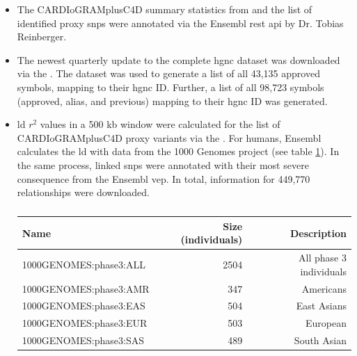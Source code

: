 \begin{itemize}
    \item {} The CARDIoGRAMplusC4D summary statistics from \textcite{aragamDiscoverySystematicCharacterization2021} and the list of identified proxy \acp{snp} were annotated via the Ensembl \ac{rest} \ac{api} by Dr. Tobias Reinberger.

    \item {} The newest quarterly update to the complete \ac{hgnc} dataset was downloaded via the . The dataset was used to generate a list of all 43,135 approved symbols, mapping to their \ac{hgnc} ID. Further, a list of all 98,723 symbols (approved, alias, and previous) mapping to their \ac{hgnc} ID was generated.

    \item {} \ac{ld} $r^2$ values in a 500 kb window were calculated for the list of CARDIoGRAMplusC4D proxy variants via the . For humans, Ensembl calculates the \ac{ld} with data from the 1000 Genomes project (see table \ref{tab:populations}). In the same process, linked \acp{snp} were annotated with their most severe consequence from the Ensembl \ac{vep}. In total, information for 449,770 relationships were downloaded.

    \begin{table}[h]
    \capstart
    \centering
    \begin{minipage}{\captionwidth}
        \caption[1000 Genomes Populations]{}
        \label{tab:populations}
    \end{minipage}
    \begin{tabular}{|l|r|r|}
        \hline
        Name                   & Size (individuals)   & Description      \\ \hline
        1000GENOMES:phase3:ALL & 2504                 & All phase 3 individuals  \\
        1000GENOMES:phase3:AMR & 347                  & Americans  \\
        1000GENOMES:phase3:EAS & 504                  & East Asians  \\
        1000GENOMES:phase3:EUR & 503                  & European \\
        1000GENOMES:phase3:SAS & 489                  & South Asian  \\ \hline
    \end{tabular}
    \end{table}


\end{itemize}
